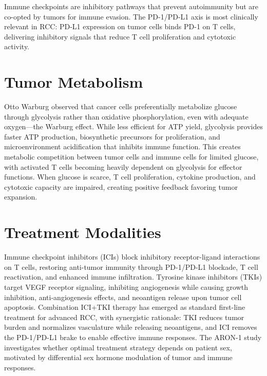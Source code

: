 Immune checkpoints are inhibitory pathways that prevent autoimmunity but are co-opted by tumors for immune evasion. The PD-1/PD-L1 axis is most clinically relevant in RCC: PD-L1 expression on tumor cells binds PD-1 on T cells, delivering inhibitory signals that reduce T cell proliferation and cytotoxic activity.

\section{Tumor Metabolism}
\label{sec:bg_metabolism}

Otto Warburg observed that cancer cells preferentially metabolize glucose through glycolysis rather than oxidative phosphorylation, even with adequate oxygen—the Warburg effect. While less efficient for ATP yield, glycolysis provides faster ATP production, biosynthetic precursors for proliferation, and microenvironment acidification that inhibits immune function. This creates metabolic competition between tumor cells and immune cells for limited glucose, with activated T cells becoming heavily dependent on glycolysis for effector functions. When glucose is scarce, T cell proliferation, cytokine production, and cytotoxic capacity are impaired, creating positive feedback favoring tumor expansion.

\section{Treatment Modalities}
\label{sec:bg_treatments}

Immune checkpoint inhibitors (ICIs) block inhibitory receptor-ligand interactions on T cells, restoring anti-tumor immunity through PD-1/PD-L1 blockade, T cell reactivation, and enhanced immune infiltration. Tyrosine kinase inhibitors (TKIs) target VEGF receptor signaling, inhibiting angiogenesis while causing growth inhibition, anti-angiogenesis effects, and neoantigen release upon tumor cell apoptosis. Combination ICI+TKI therapy has emerged as standard first-line treatment for advanced RCC, with synergistic rationale: TKI reduces tumor burden and normalizes vasculature while releasing neoantigens, and ICI removes the PD-1/PD-L1 brake to enable effective immune responses. The ARON-1 study investigates whether optimal treatment strategy depends on patient sex, motivated by differential sex hormone modulation of tumor and immune responses.